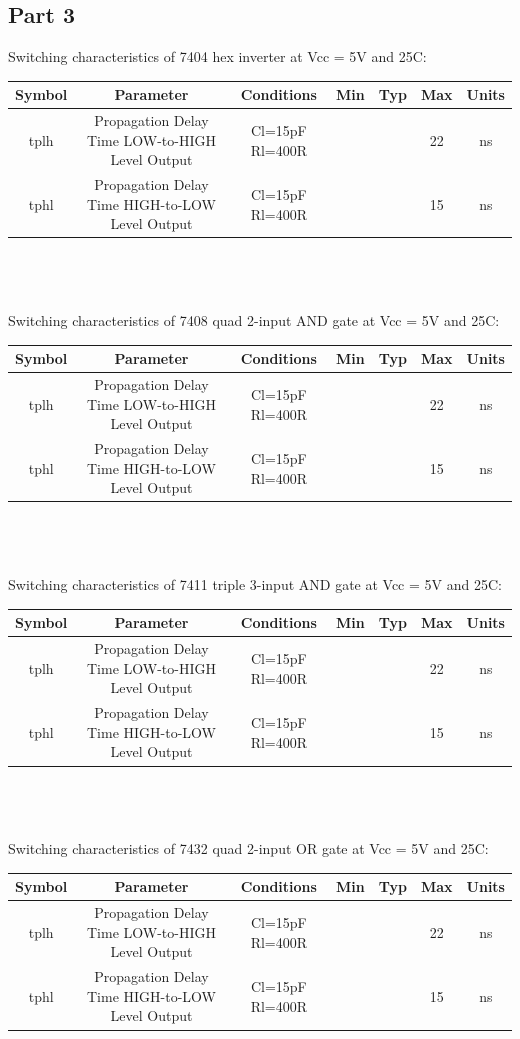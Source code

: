 \documentclass{article}
\begin{document}
\subsection{Part 3}
Switching characteristics of 7404 hex inverter at Vcc = 5V and 25\degree C: \\
\begin{tabular} {|c|c|c|c|c|c|c|}
    \hline
    Symbol & Parameter & Conditions & Min & Typ & Max & Units \\
    \hline
    tplh & Propagation Delay Time LOW-to-HIGH Level Output & Cl=15pF Rl=400R & & & 22 & ns \\
    tphl & Propagation Delay Time HIGH-to-LOW Level Output & Cl=15pF Rl=400R & & & 15 & ns \\
    \hline
\end{tabular}
\\ \\ \\
Switching characteristics of 7408 quad 2-input AND gate at Vcc = 5V and 25\degree C: \\
\begin{tabular} {|c|c|c|c|c|c|c|}
    \hline
    Symbol & Parameter & Conditions & Min & Typ & Max & Units \\
    \hline
    tplh & Propagation Delay Time LOW-to-HIGH Level Output & Cl=15pF Rl=400R & & & 22 & ns \\
    tphl & Propagation Delay Time HIGH-to-LOW Level Output & Cl=15pF Rl=400R & & & 15 & ns \\
    \hline
\end{tabular}
\\ \\ \\
Switching characteristics of 7411 triple 3-input AND gate at Vcc = 5V and 25\degree C: \\
\begin{tabular} {|c|c|c|c|c|c|c|}
    \hline
    Symbol & Parameter & Conditions & Min & Typ & Max & Units \\
    \hline
    tplh & Propagation Delay Time LOW-to-HIGH Level Output & Cl=15pF Rl=400R & & & 22 & ns \\
    tphl & Propagation Delay Time HIGH-to-LOW Level Output & Cl=15pF Rl=400R & & & 15 & ns \\
    \hline
\end{tabular}
\\ \\ \\
Switching characteristics of 7432 quad 2-input OR gate at Vcc = 5V and 25\degree C: \\
\begin{tabular} {|c|c|c|c|c|c|c|}
    \hline
    Symbol & Parameter & Conditions & Min & Typ & Max & Units \\
    \hline
    tplh & Propagation Delay Time LOW-to-HIGH Level Output & Cl=15pF Rl=400R & & & 22 & ns \\
    tphl & Propagation Delay Time HIGH-to-LOW Level Output & Cl=15pF Rl=400R & & & 15 & ns \\
    \hline
\end{tabular}
\end{document}
